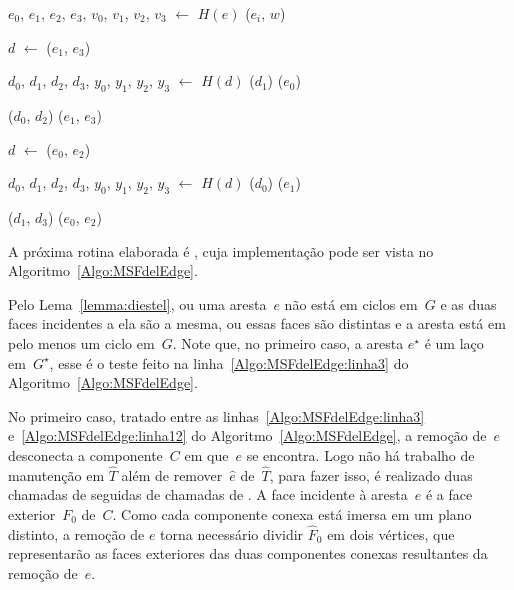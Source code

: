 \begin{algorithm}[htb]
\caption{\MSFupdate($G$, $e$, $w$)}
\label{Algo:MSFupdate}
\begin{algorithmic}[1]
\State $e_0$, $e_1$, $e_2$, $e_3$, $v_0$, $v_1$, $v_2$, $v_3$ $\gets$ $H(e)$
\State  \LCOAddCost($e_i$, $w$)
\EndFor

\State $d$ $\gets$ \LCOMin($e_1$, $e_3$)\label{Algo:MSFupdate:linhamin}

\State $d_0$, $d_1$, $d_2$, $d_3$, $y_0$, $y_1$, $y_2$, $y_3$ $\gets$ $H(d)$
\State \LCOSplit($d_1$)\label{Algo:MSFupdate:linhasplitd}
\State \LCOSplit($e_0$)\label{Algo:MSFupdate:linhasplite}


\State \LCOMerge($d_0$, $d_2$)\label{Algo:MSFupdate:linhas:Merged}
\State \LCOMerge($e_1$, $e_3$)\label{Algo:MSFupdate:linhas:Mergee}

\EndIf

\Else{}
\State $d$ $\gets$ \LCOMax($e_0$, $e_2$)\label{Algo:MSFupdate:dualinicio}

\State $d_0$, $d_1$, $d_2$, $d_3$, $y_0$, $y_1$, $y_2$, $y_3$ $\gets$ $H(d)$
\State \LCOSplit($d_0$)
\State \LCOSplit($e_1$)

\State \LCOMerge($d_1$, $d_3$)
\State \LCOMerge($e_0$, $e_2$)

\EndIf
\EndIf\label{Algo:MSFupdate:dualfim}
\end{algorithmic}
\end{algorithm}


A próxima rotina elaborada é \MSFdelEdge{}, cuja implementação pode ser vista no Algoritmo~\ref{Algo:MSFdelEdge}.

Pelo Lema~\ref{lemma:diestel}, ou uma aresta~$e$ não está em ciclos em~$G$ e as duas faces incidentes a ela são a mesma, ou essas faces são distintas e a aresta está em pelo menos um ciclo em~$G$.
Note que, no primeiro caso, a aresta $e^\star$ é um laço em~$G^\star$, esse é o teste feito na linha~\ref{Algo:MSFdelEdge:linha3} do Algoritmo~\ref{Algo:MSFdelEdge}.

No primeiro caso, tratado entre as linhas~\ref{Algo:MSFdelEdge:linha3} e~\ref{Algo:MSFdelEdge:linha12} do Algoritmo~\ref{Algo:MSFdelEdge}, a remoção de~$e$ desconecta a componente~$C$ em que~$e$ se encontra.
Logo não há trabalho de manutenção em $\hat T$ além de remover~$\hat e$ de~$\hat T$, para fazer isso, é realizado 
duas chamadas de \LCOCycle{} seguidas de chamadas de \LCOSplit{}.
A face incidente à aresta~$e$ é a face exterior~$F_0$ de~$C$.
Como cada componente conexa está imersa em um plano distinto, a remoção de $e$ torna necessário dividir $\hat F_0$ em dois vértices, que representarão as faces exteriores das duas componentes conexas resultantes da remoção de~$e$.

